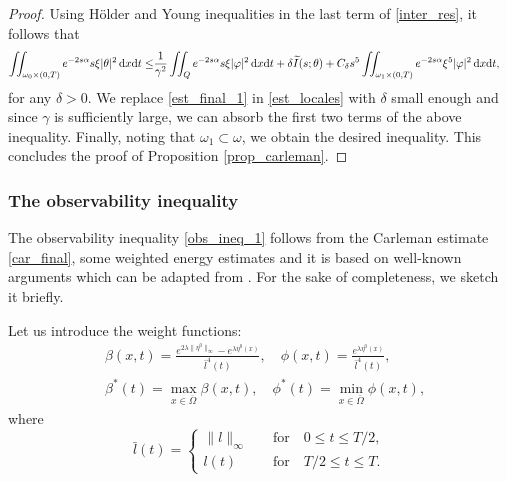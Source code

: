 \documentclass{aims}
\theoremstyle{definition}
\def\dx{\,\textnormal{d}x}
\def\dt{\textnormal{d}t}
\begin{document}
\begin{proof}
Using H\"older and Young inequalities in the last term of \eqref{inter_res}, it follows that
%
\begin{equation}\label{est_final_1}
\begin{split}
\iint_{\omega_0\times(0,T)}e^{-2s\alpha}s\xi|\theta|^2\dx\dt\leq& \frac{1}{\gamma^2}\iint_{Q}e^{-2s\alpha}s\xi |\varphi|^2\dx\dt+\delta \widetilde I(s;\theta)+C_{\delta}s^5\iint_{\omega_1\times(0,T)}e^{-2s\alpha}\xi^5|\varphi|^2\dx\dt,
\end{split}
\end{equation}
%
for any $\delta>0$. We replace \eqref{est_final_1} in \eqref{est_locales} with $\delta$ small enough and  since $\gamma$ is sufficiently large, we can absorb the first two terms of the above inequality. Finally, noting that $\omega_1\subset \omega$, we obtain the desired inequality. This concludes the proof of Proposition \ref{prop_carleman}.
%
\end{proof}

\subsubsection*{The observability inequality}

The observability inequality \eqref{obs_ineq_1} follows from the Carleman estimate \eqref{car_final}, some weighted energy estimates and it is based on well-known arguments which can be adapted from \cite[Lemma 1]{cara_NS}. For the sake of completeness, we sketch it briefly. 

Let us introduce the weight functions:
%
\begin{equation}\label{weights_rec} 
\begin{split}
&\beta(x,t)= \frac{e^{2\lambda\|\eta^0\|_\infty}-e^{\lambda\eta^0(x)}}{\bar l^4(t)}, \quad \phi(x,t)=\frac{e^{\lambda \eta^0(x)}}{\bar l^4(t)}, \\
&\beta^*(t)=\max_{x\in\overline{\Omega}}\beta(x,t), \quad \phi^*(t)=\min_{x\in\overline\Omega} \phi(x,t),
\end{split}
\end{equation}
%
where 
\begin{equation*}
\bar l(t)=
\begin{cases}
\|l\|_\infty &\quad\text{for}\quad 0\leq t\leq T/2, \\
l(t) &\quad\text{for}\quad T/2\leq t\leq T. 
\end{cases}
\end{equation*}
\end{document}
